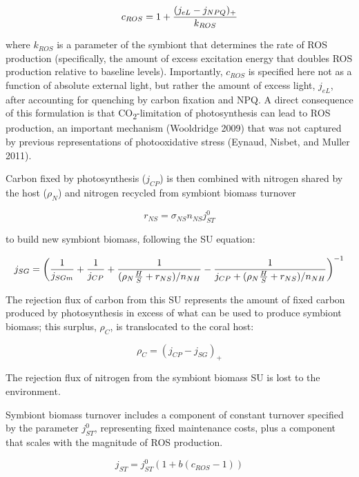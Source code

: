 \documentclass[]{elsarticle} %
\begin{document}
\begin{equation} c_{ROS} = 1 + {{(j_{eL} - j_{NPQ})_+} \over k_{ROS}} \end{equation}

where \(k_{ROS}\) is a parameter of the symbiont that determines the
rate of ROS production (specifically, the amount of excess excitation
energy that doubles ROS production relative to baseline levels).
Importantly, \(c_{ROS}\) is specified here not as a function of absolute
external light, but rather the amount of excess light, \(j_{eL}\), after
accounting for quenching by carbon fixation and NPQ. A direct
consequence of this formulation is that CO\textsubscript{2}-limitation
of photosynthesis can lead to ROS production, an important mechanism
(Wooldridge 2009) that was not captured by previous representations of
photooxidative stress (Eynaud, Nisbet, and Muller 2011).

Carbon fixed by photosynthesis (\(j_{CP}\)) is then combined with
nitrogen shared by the host (\(\rho_N\)) and nitrogen recycled from
symbiont biomass turnover

\begin{equation} r_{NS}=\sigma_{NS}n_{NS}j_{ST}^0 \end{equation}

to build new symbiont biomass, following the SU equation:

\begin{equation} j_{SG} = \bigg({1 \over j_{SGm}} + {1 \over j_{CP}} + {1 \over {(\rho_N{H \over S} + r_{NS}) / n_{NH}}} - {1 \over {j_{CP} + (\rho_N{H \over S} + r_{NS}) / n_{NH}}}\bigg)^{-1} \end{equation}

The rejection flux of carbon from this SU represents the amount of fixed
carbon produced by photosynthesis in excess of what can be used to
produce symbiont biomass; this surplus, \(\rho_C\), is translocated to
the coral host:

\begin{equation} \rho_C = (j_{CP} - j_{SG})_+ \end{equation}

The rejection flux of nitrogen from the symbiont biomass SU is lost to
the environment.

Symbiont biomass turnover includes a component of constant turnover
specified by the parameter \(j_{ST}^0\), representing fixed maintenance
costs, plus a component that scales with the magnitude of ROS
production.

\begin{equation} j_{ST} = j_{ST}^0(1 + b(c_{ROS}-1)) \end{equation}
\end{document}

